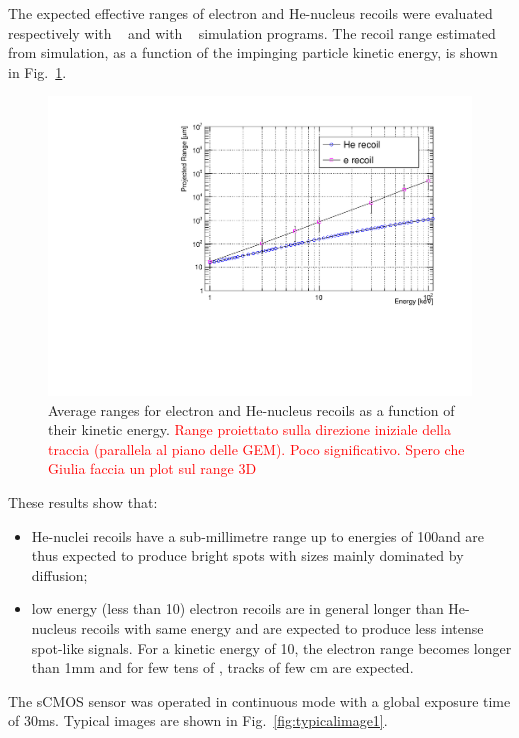\documentclass[12pt]{iopart}
\begin{document}
The expected effective ranges of electron and He-nucleus recoils were
evaluated respectively with \GEANTfour~\cite{GEANT4} and with
\SRIM~\cite{bib:srim} simulation programs. The recoil range estimated
from simulation, as a function of the impinging particle kinetic
energy, is shown in Fig.~\ref{fig:range}. 
%
\begin{figure}[ht]
  \begin{center}
    \includegraphics[width=0.49\linewidth]{figures/range_ER_NR.pdf}
    \caption{Average ranges for electron and He-nucleus recoils as a
      function of their kinetic energy.  \textcolor{red}{Range
        proiettato sulla direzione iniziale della traccia (parallela
        al piano delle GEM). Poco significativo. Spero che Giulia
        faccia un plot sul range 3D}
      \label{fig:range}}
      \end{center}
\end{figure}
%
These results show that:
\begin{itemize}
    \item He-nuclei recoils have a sub-millimetre range up to energies
      of 100\keV and are thus expected to produce bright spots with
      sizes mainly dominated by diffusion;
    \item low energy (less than 10\keV) electron recoils are in
      general longer than He-nucleus recoils with same energy and are
      expected to produce less intense spot-like signals. For a
      kinetic energy of 10\keV, the electron range becomes longer than
      1\unit{mm} and for few tens of \keV, tracks of few cm are
      expected.
\end{itemize}


The sCMOS sensor was operated in continuous mode with a global
exposure time of 30\unit{ms}. Typical images are shown in Fig.~\ref{fig:typicalimage1}. 
\end{document}

